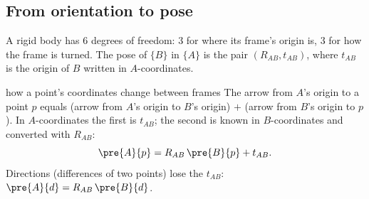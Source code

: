 \subsection{From orientation to pose}\label{sec:rot:orientation-pose}
A rigid body has 6 degrees of freedom: 3 for where its frame's origin is, 3 for how the frame is turned. The pose of $\{B\}$ in $\{A\}$ is the pair $(R_{AB},t_{AB})$, where $t_{AB}$ is the origin of $B$ written in $A$-coordinates.

\begin{deriv}{how a point's coordinates change between frames}
The arrow from $A$'s origin to a point $p$ equals (arrow from $A$'s origin to $B$'s origin) $+$ (arrow from $B$'s origin to $p$). In $A$-coordinates the first is $t_{AB}$; the second is known in $B$-coordinates and converted with $R_{AB}$:
\[
\pre{A}{p}=R_{AB}\,\pre{B}{p}+t_{AB}.
\]
Directions (differences of two points) lose the $t_{AB}$: $\pre{A}{d}=R_{AB}\,\pre{B}{d}$.
\end{deriv}
